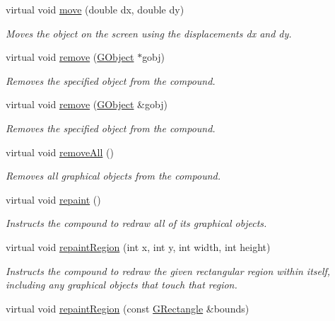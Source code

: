 \begin{DoxyCompactItemize}
virtual void \mbox{\hyperlink{classGObject_a5973d8dda83afb36e2c56855515be392}{move}} (double dx, double dy)
\begin{DoxyCompactList}\small\item\em Moves the object on the screen using the displacements {\ttfamily dx} and {\ttfamily dy}. \end{DoxyCompactList}\item 
virtual void \mbox{\hyperlink{classGCompound_a49dc57a2ce4caa354a5fff6acdde2e7d}{remove}} (\mbox{\hyperlink{classGObject}{G\+Object}} $\ast$gobj)
\begin{DoxyCompactList}\small\item\em Removes the specified object from the compound. \end{DoxyCompactList}\item 
virtual void \mbox{\hyperlink{classGCompound_a0c0ae4d69b584602ff3cba0d9cf330a4}{remove}} (\mbox{\hyperlink{classGObject}{G\+Object}} \&gobj)
\begin{DoxyCompactList}\small\item\em Removes the specified object from the compound. \end{DoxyCompactList}\item 
virtual void \mbox{\hyperlink{classGCompound_a9b0a5a3ad9972ab0e8eb0b54873aac6b}{remove\+All}} ()
\begin{DoxyCompactList}\small\item\em Removes all graphical objects from the compound. \end{DoxyCompactList}\item 
virtual void \mbox{\hyperlink{classGCompound_ac827b978aa122f136a14c198687ad80f}{repaint}} ()
\begin{DoxyCompactList}\small\item\em Instructs the compound to redraw all of its graphical objects. \end{DoxyCompactList}\item 
virtual void \mbox{\hyperlink{classGCompound_a4a919e3851ebfbf0f161a66cc15d4531}{repaint\+Region}} (int x, int y, int width, int height)
\begin{DoxyCompactList}\small\item\em Instructs the compound to redraw the given rectangular region within itself, including any graphical objects that touch that region. \end{DoxyCompactList}\item 
virtual void \mbox{\hyperlink{classGCompound_a769c46fb3e1004aec76e8b0adfa42aa6}{repaint\+Region}} (const \mbox{\hyperlink{classGRectangle}{G\+Rectangle}} \&bounds)

\end{DoxyCompactItemize}

